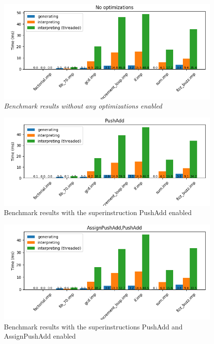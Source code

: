 \documentclass{article}
\begin{document}
\begin{figure}[h]
    \centering
    \includegraphics[width=1\textwidth]{../BenchmarkImages/No_Optimizations.png}
    \caption{\textit{Benchmark results without any optimizations enabled}}
\end{figure}

\begin{figure}[h]
    \centering
    \includegraphics[width=1\textwidth]{../BenchmarkImages/PushAdd.png}
    \caption{Benchmark results with the superinstruction PushAdd enabled}
\end{figure}

\begin{figure}[h]
    \centering
    \includegraphics[width=1\textwidth]{../BenchmarkImages/AssignPushAdd_PushAdd.png}
    \caption{Benchmark results with the superinstructions PushAdd and AssignPushAdd enabled}
\end{figure}
\end{document}
